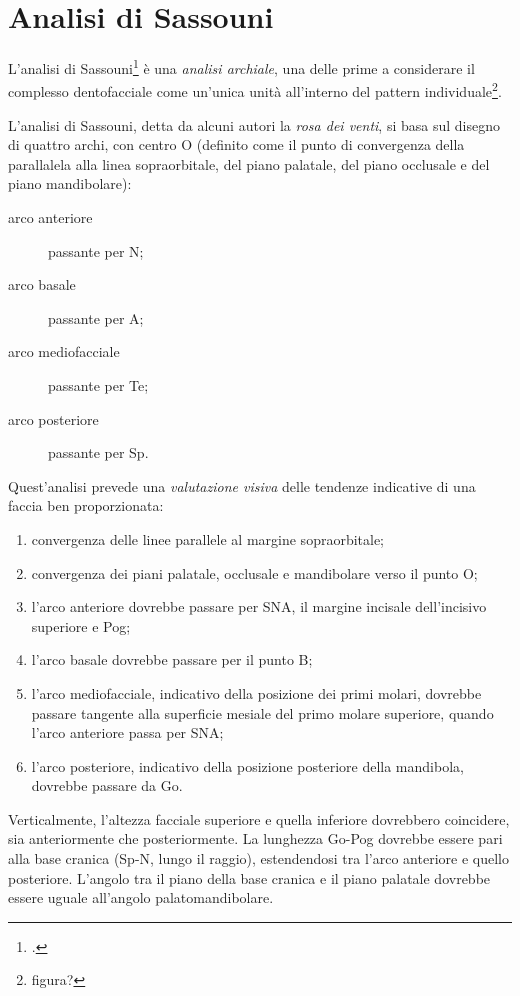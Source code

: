 \chapter{Analisi di Sassouni}
L'analisi di Sassouni\footcite{Sassouni1955,Sassouni1969} è una \textit{analisi archiale}, una delle prime a considerare il complesso dentofacciale come un'unica unità all'interno del pattern individuale\footnote{figura?}.

L'analisi di Sassouni, detta da alcuni autori la \textit{rosa dei venti}, si basa sul disegno di quattro archi, con centro O (definito come il punto di convergenza della parallalela alla linea sopraorbitale, del piano palatale, del piano occlusale e del piano mandibolare):

\begin{description}
\item[arco anteriore] passante per N;
\item[arco basale] passante per A;
\item[arco mediofacciale] passante per Te;
\item[arco posteriore] passante per Sp.
\end{description}

Quest'analisi prevede una \textit{valutazione visiva} delle tendenze indicative di una faccia ben proporzionata:

\begin{enumerate}
\item convergenza delle linee parallele al margine sopraorbitale;
\item convergenza dei piani palatale, occlusale e mandibolare verso il punto O;
\item l'arco anteriore dovrebbe passare per SNA, il margine incisale dell'incisivo superiore e Pog;
\item l'arco basale dovrebbe passare per il punto B;
\item l'arco mediofacciale, indicativo della posizione dei primi molari, dovrebbe passare tangente alla superficie mesiale del primo molare superiore, quando l'arco anteriore passa per SNA;
\item l'arco posteriore, indicativo della posizione posteriore della mandibola, dovrebbe passare da Go.
\end{enumerate}

Verticalmente, l'altezza facciale superiore e quella inferiore dovrebbero coincidere, sia anteriormente che posteriormente. La lunghezza Go-Pog dovrebbe essere pari alla base cranica (Sp-N, lungo il raggio), estendendosi tra l'arco anteriore e quello posteriore. L'angolo tra il piano della base cranica e il piano palatale dovrebbe essere uguale all'angolo palatomandibolare.

